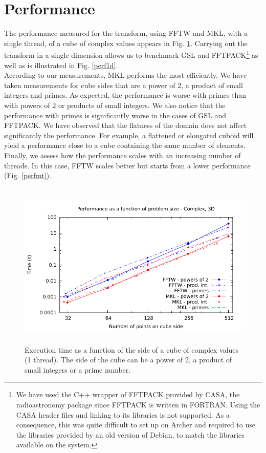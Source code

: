 \documentclass[12pt, a4paper]{article}
\begin{document}
\section{Performance}

The performance measured for the transform, using FFTW and MKL, with a single thread, of a cube of complex values appears in Fig. \ref{perf3d}. Carrying out the transform in a single dimension allows us to benchmark GSL and FFTPACK\footnote{We have used the C++ wrapper of FFTPACK provided by CASA, the radioastronomy package \cite{casa} since FFTPACK is written in FORTRAN. Using the CASA header files and linking to its libraries is not supported. As a consequence, this was quite difficult to set up on Archer and required to use the libraries provided by an old version of Debian, to match the libraries available on the system.} as well as is illustrated in Fig. \ref{perf1d}.\\

According to our measurements, MKL performs the most efficiently. We have taken measurements for cube sides that are a power of 2, a product of small integers and primes. As expected, the performance is worse with primes than with powers of 2 or products of small integers. We also notice that the performance with primes is significantly worse in the cases of GSL and FFTPACK. We have observed that the flatness of the domain does not affect significantly the performance. For example, a flattened or elongated cuboid will yield a performance close to a cube containing the same number of elements.\\

Finally, we assess how the performance scales with an increasing number of threads. In this case, FFTW scales better but starts from a lower performance (Fig. \ref{perfmt}).
\begin{figure}[H]
\captionsetup{width=0.6\textwidth}
\centering
\includegraphics[height=8cm]{graphs/performance3dc/performance3dc.pdf}
\caption{Execution time as a function of the side of a cube of complex values (1 thread). The side of the cube can be a power of 2, a product of small integers or a prime number.}
\label{perf3d}
\end{figure}
\end{document}
